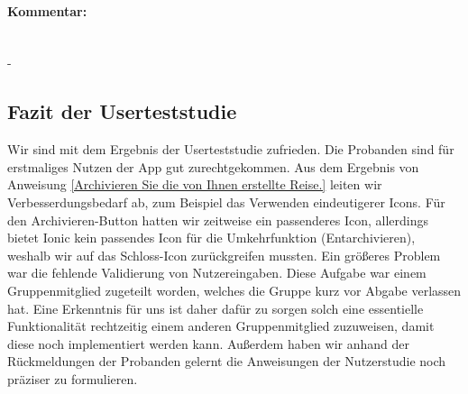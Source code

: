 	\paragraph{Kommentar:}\ \\
	-
	
\subsection{Fazit der Userteststudie}
Wir sind mit dem Ergebnis der Userteststudie zufrieden. Die Probanden sind für erstmaliges Nutzen der App gut zurechtgekommen. Aus dem Ergebnis von Anweisung \ref{Archivieren Sie die von Ihnen erstellte Reise.} leiten wir
Verbesserdungsbedarf ab, zum Beispiel das Verwenden eindeutigerer Icons. Für den Archivieren-Button hatten wir
zeitweise ein passenderes Icon, allerdings bietet Ionic kein passendes Icon für die Umkehrfunktion (Entarchivieren), weshalb wir auf das Schloss-Icon zurückgreifen mussten.
Ein größeres Problem war die fehlende Validierung von Nutzereingaben. Diese Aufgabe war einem Gruppenmitglied zugeteilt worden, welches die Gruppe kurz vor Abgabe verlassen hat. Eine Erkenntnis für uns ist daher dafür zu sorgen solch eine essentielle Funktionalität rechtzeitig einem anderen Gruppenmitglied zuzuweisen, damit diese noch implementiert werden kann.
Außerdem haben wir anhand der Rückmeldungen der Probanden gelernt die Anweisungen der Nutzerstudie noch präziser zu formulieren.
